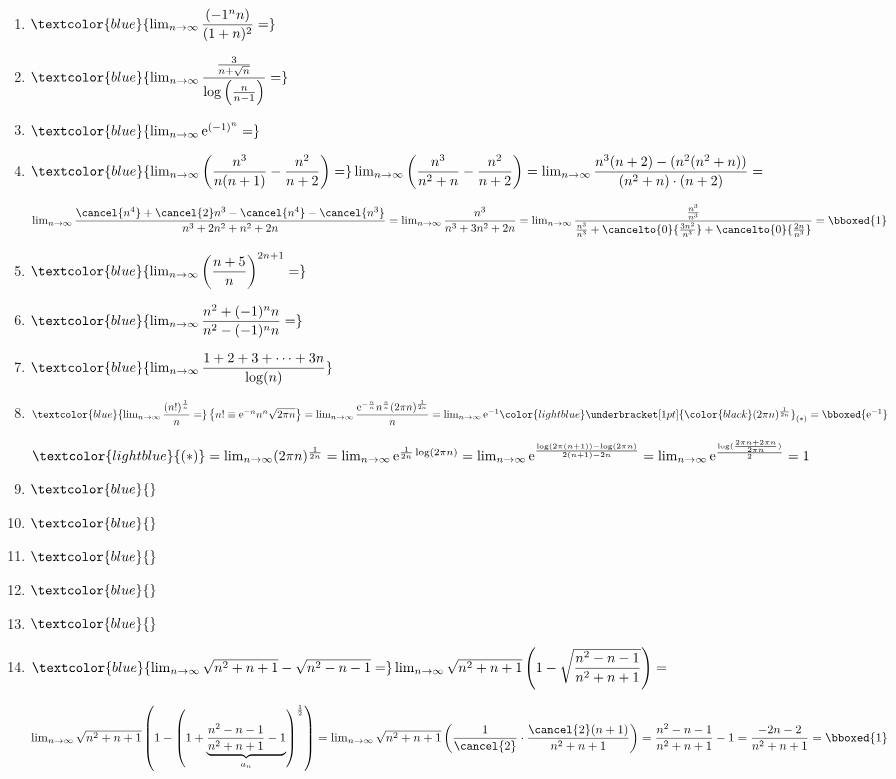 \begin{enumerate}[label=\color{red}\alph*), leftmargin=*]
	\item $\textcolor{blue}{\lim_{n\to\infty}\dfrac{(-1^nn)}{(1+n)^2}=}$
	\item $\textcolor{blue}{\lim_{n\to\infty}\dfrac{\frac{3}{n+\sqrt{n}}}{\log\left(\frac{n}{n-1}\right)}=}$
	\item $\textcolor{blue}{\lim_{n\to\infty}\mathrm{e}^{(-1)^n}=}$
	\item $\textcolor{blue}{\lim_{n\to\infty}\left(\dfrac{n^3}{n(n+1)}-\dfrac{n^2}{n+2}\right)=}\lim_{n\to\infty}\left(\dfrac{n^3}{n^2+n}-\dfrac{n^2}{n+2}\right)=\lim_{n\to\infty}\dfrac{n^3(n+2)-(n^2(n^2+n))}{(n^2+n)\cdot(n+2)}=$
    
    $\lim_{n\to\infty}\dfrac{\cancel{n^4}+\cancel{2}n^3-\cancel{n^4}-\cancel{n^3}}{n^3+2n^2+n^2+2n}=\lim_{n\to\infty}\dfrac{n^3}{n^3+3n^2+2n}=\lim_{n\to\infty}\dfrac{\frac{n^3}{n^3}}{\frac{n^3}{n^3}+\cancelto{0}{\frac{3n^2}{n^3}}+\cancelto{0}{\frac{2n}{n^3}}}=\bboxed{1}$
	\item $\textcolor{blue}{\lim_{n\to\infty}\left(\dfrac{n+5}{n}\right)^{2n+1}=}$
	\item $\textcolor{blue}{\lim_{n\to\infty}\dfrac{n^2+(-1)^nn}{n^2-(-1)^nn}=}$
	\item $\textcolor{blue}{\lim_{n\to\infty}\dfrac{1+2+3+\cdots+3n}{\log(n)}}$
	\item $\textcolor{blue}{\lim_{n\to\infty}\dfrac{(n!)^{\frac{1}{n}}}{n}=}\left\{n!\equiv\mathrm{e}^{-n}n^n\sqrt{2\pi n}\right\}=\lim_{n\to\infty}\dfrac{\mathrm{e}^{-\frac{n}{n}}n^{\frac{n}{n}}(2\pi n)^{\frac{1}{2n}}}{n}=\lim_{n\to\infty}\mathrm{e}^{-1}{\color{lightblue}\underbracket[1pt]{{\color{black}(2\pi n)^{\frac{1}{2n}}}}_{(\ast)}}=\bboxed{\mathrm{e}^{-1}}$
	
	$\textcolor{lightblue}{(\ast)}=\lim_{n\to\infty}(2\pi n)^{\frac{1}{2n}}=\lim_{n\to\infty}\mathrm{e}^{\frac{1}{2n}\log(2 \pi n)}=\lim_{n\to\infty}\mathrm{e}^{\frac{\log(2\pi(n+1))-\log(2\pi n)}{2(n+1)-2n}}=\lim_{n\to\infty}\mathrm{e}^{\frac{\log(\frac{2\pi n+2\pi n}{2\pi n})}{2}}=1$
	
	\item $\textcolor{blue}{}$
	\item $\textcolor{blue}{}$
	\item $\textcolor{blue}{}$
	\item $\textcolor{blue}{}$
	\item $\textcolor{blue}{}$
	\item $\textcolor{blue}{\lim_{n\to\infty}\sqrt{n^2+n+1}-\sqrt{n^2-n-1}=}\lim_{n\to\infty}\sqrt{n^2+n+1}\left(1-\sqrt{\dfrac{n^2-n-1}{n^2+n+1}}\right)=$
	
	$\lim_{n\to\infty}\sqrt{n^2+n+1}\left(1-\left(1+\underbrace{\dfrac{n^2-n-1}{n^2+n+1}-1}_{a_n}\right)^{\frac{1}{2}}\right)=\lim_{n\to\infty}\sqrt{n^2+n+1}\left(\dfrac{1}{\cancel{2}}\cdot\dfrac{\cancel{2}(n+1)}{n^2+n+1}\right)=\dfrac{n^2-n-1}{n^2+n+1}-1=\dfrac{-2n-2}{n^2+n+1}=\bboxed{1}$
\end{enumerate}

